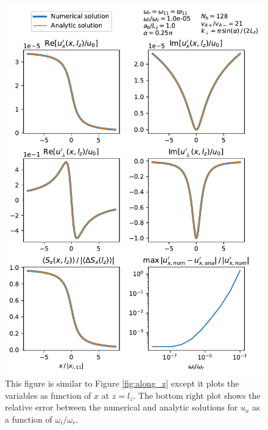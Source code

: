 \documentclass[linenumbers]{aastex63}
\begin{document}
\begin{figure}
    \centering
    \includegraphics[width=17cm,height=0.94\textheight,keepaspectratio]{along_x.pdf}
    \caption{This figure is similar to Figure \ref{fig:along_z} except it plots the variables as function of $x$ at $z=l_z$. The bottom right plot shows the relative error between the numerical and analytic solutions for $u_x$ as a function of $\omega_i / \omega_r$.}
    \label{fig:along_x}
\end{figure}
\end{document}
